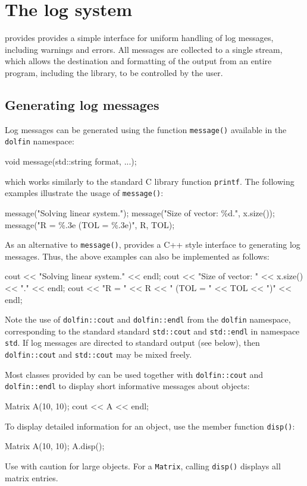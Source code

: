 \chapter{The log system}

\dolfin{} provides provides a simple interface for uniform handling of
log messages, including warnings and errors. All messages are
collected to a single stream, which allows the destination and
formatting of the output from an entire program, including the
\dolfin{} library, to be controlled by the user.

\section{Generating log messages}

Log messages can be generated using the function
\texttt{message()} available in the \texttt{dolfin} namespace:
\begin{code}
void message(std::string format, ...);
\end{code}
which works similarly to the standard C library function \texttt{printf}.
The following examples illustrate the usage of
\texttt{message()}:
\begin{code}
message("Solving linear system.");
message("Size of vector: \%d.", x.size());
message("R = \%.3e (TOL = \%.3e)", R, TOL);
\end{code}

As an alternative to \texttt{message()}, \dolfin{} provides a C++
style interface to generating log messages. Thus, the above examples
can also be implemented as follows:
\footnotesize
\begin{code}
cout << "Solving linear system." << endl;
cout << "Size of vector: " << x.size() << "." << endl;
cout << "R = " << R << " (TOL = " << TOL << ")" << endl;
\end{code}
\normalsize
Note the use of \texttt{dolfin::cout} and
\texttt{dolfin::endl} from the \texttt{dolfin} namespace,
corresponding to the standard standard \texttt{std::cout} and
\texttt{std::endl} in namespace \texttt{std}. If log messages are
directed to standard output (see below), then \texttt{dolfin::cout}
and \texttt{std::cout} may be mixed freely.

Most classes provided by \dolfin{} can be used together with
\texttt{dolfin::cout} and \texttt{dolfin::endl} to display short
informative messages about objects:
\begin{code}
Matrix A(10, 10);
cout << A << endl;
\end{code}
To display detailed information for an object,  use the member function
\texttt{disp()}:
\begin{code}
Matrix A(10, 10);
A.disp();
\end{code}
Use with caution for large objects. For a \texttt{Matrix}, calling
\texttt{disp()} displays all matrix entries.

